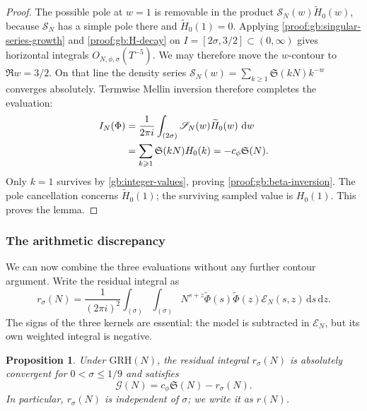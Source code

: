 \documentclass[12pt,a4paper]{amsart}
\numberwithin{equation}{section}
\def\d{\,{\rm d}}
\def\le{\leqslant}
\def\ge{\geqslant}
\theoremstyle{plain}
\newtheorem{proposition}{Proposition}[section]
\theoremstyle{definition}
\theoremstyle{remark}
\begin{document}
\begin{proof}
The possible pole at $w=1$ is removable in the product
$\mathscr S_N(w)\widetilde H_0(w)$, because $\mathscr S_N$ has a
simple pole there and $\widetilde H_0(1)=0$.
Applying \eqref{proof:gb:singular-series-growth} and
\eqref{proof:gb:H-decay} on $I=[2\sigma,3/2]\subset(0,\infty)$ gives
horizontal integrals
$O_{N,\phi,\sigma}(T^{-5})$. We may therefore move the $w$-contour
to $\Re w=3/2$. On that line the density series
$\mathscr S_N(w)=\sum_{k\ge1}\mathfrak S(kN)k^{-w}$
converges absolutely. Termwise Mellin inversion
therefore completes the evaluation:
\begin{equation}\label{gb:single-contour}
 \begin{aligned}
 I_N(\Phi)&=\frac1{2\pi i}\int_{(2\sigma)}
       \mathscr S_N(w)\widetilde H_0(w)\,\d w\\
       &=\sum_{k\ge1}\mathfrak S(kN)H_0(k)
        =-c_\phi\mathfrak S(N).
 \end{aligned}
\end{equation}
Only $k=1$ survives by \eqref{gb:integer-values}, proving
\eqref{proof:gb:beta-inversion}. The pole cancellation concerns
$\widetilde H_0(1)$; the surviving sampled value is $H_0(1)$.
This proves the lemma.
\end{proof}

\subsubsection{The arithmetic discrepancy}

We can now combine the three evaluations without any further contour
argument. Write the residual integral as
\begin{equation}\label{proof:gb:residual-integral}
 r_\sigma(N)=\frac1{(2\pi i)^2}
   \int_{(\sigma)}\int_{(\sigma)}
   N^{s+z}\widetilde\Phi(s)\widetilde\Phi(z)
                              \mathscr E_N(s,z)\,\mathrm{d}s\,\mathrm{d}z.
\end{equation}
The signs of the three kernels are essential: the model is subtracted
in $\mathscr E_N$, but its own weighted integral is negative.

\begin{proposition}\label{proof:v3w:exact-moving}
Under $\mathrm{GRH}(N)$, the residual integral $r_\sigma(N)$ is
absolutely convergent for $0<\sigma\le1/9$ and satisfies
\begin{equation}\label{proof:gb:exact-error}
 \mathcal G(N)=c_\phi\mathfrak S(N)-r_\sigma(N).
\end{equation}
In particular, $r_\sigma(N)$ is independent of $\sigma$; we write it as
$r(N)$.
\end{proposition}
\end{document}

